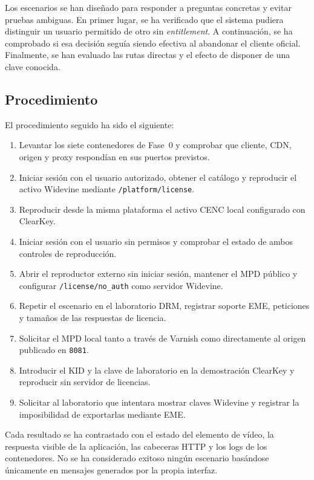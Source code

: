 Los escenarios se han diseñado para responder a preguntas concretas y evitar pruebas ambiguas. En primer lugar, se ha verificado que el sistema pudiera distinguir un usuario permitido de otro sin \textit{entitlement}. A continuación, se ha comprobado si esa decisión seguía siendo efectiva al abandonar el cliente oficial. Finalmente, se han evaluado las rutas directas y el efecto de disponer de una clave conocida.

\subsection{Procedimiento}

El procedimiento seguido ha sido el siguiente:

\begin{enumerate}
    \item Levantar los siete contenedores de Fase~0 y comprobar que cliente, CDN, origen y proxy respondían en sus puertos previstos.
    \item Iniciar sesión con el usuario autorizado, obtener el catálogo y reproducir el activo Widevine mediante \nolinkurl{/platform/license}.
    \item Reproducir desde la misma plataforma el activo CENC local configurado con ClearKey.
    \item Iniciar sesión con el usuario sin permisos y comprobar el estado de ambos controles de reproducción.
    \item Abrir el reproductor externo sin iniciar sesión, mantener el MPD público y configurar \nolinkurl{/license/no_auth} como servidor Widevine.
    \item Repetir el escenario en el laboratorio DRM, registrar soporte EME, peticiones y tamaños de las respuestas de licencia.
    \item Solicitar el MPD local tanto a través de Varnish como directamente al origen publicado en \nolinkurl{8081}.
    \item Introducir el KID y la clave de laboratorio en la demostración ClearKey y reproducir sin servidor de licencias.
    \item Solicitar al laboratorio que intentara mostrar claves Widevine y registrar la imposibilidad de exportarlas mediante EME.
\end{enumerate}

Cada resultado se ha contrastado con el estado del elemento de vídeo, la respuesta visible de la aplicación, las cabeceras HTTP y los logs de los contenedores. No se ha considerado exitoso ningún escenario basándose únicamente en mensajes generados por la propia interfaz.

